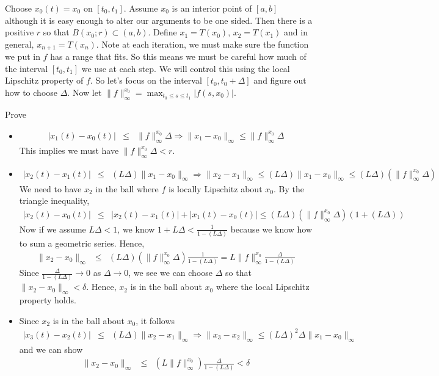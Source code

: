 \documentclass[11pt]{SelfArxOneColBMN}
\begin{document}
\noindent
Choose $x_0(t) = x_0$ on $[t_0,t_1]$.
Assume $x_0$ is an interior point of $[a,b]$
although it is easy enough to alter our arguments to be one
sided.  Then there is a positive $r$ so that $B(x_0;r) \subset (a,b)$.
Define $x_1 = T(x_0)$, $x_2 = T(x_1)$
and in general, $x_{n+1} = T(x_n)$.  Note at each
iteration, we must make sure the function we put in $f$
has a range that fits.   So this means we must be careful
how much of the interval $[t_0,t_1]$ we use at each step.
We will control this using the local Lipschitz property of $f$.
So let's focus on the interval $[t_0, t_0 + \Delta]$ and figure out
how to choose $\Delta$.  Now let $\|f\|^{x_0}_\infty = \max_{t_0 \leq s \leq t_1} |f(s,x_0)|$.

\begin{exercise}
Prove
\begin{itemize}
\item 
\begin{eqnarray*}
|x_1(t) - x_0(t)| &\leq& \|f\|^{x_0}_\infty \Delta
\Longrightarrow
\|x_1 - x_0\|_\infty \leq \|f\|^{x_0}_\infty \Delta
\end{eqnarray*}
\noindent
This implies we must have $\|f\|^{x_0}_\infty \Delta < r$.
\item
\begin{eqnarray*}
|x_2(t) - x_1(t)| &\leq& (L \Delta) \|x_1 - x_0\|_\infty
\Longrightarrow
\|x_2 - x_1\|_\infty \leq  ( L \Delta)  \|x_1 - x_0\|_\infty \leq  ( L \Delta) (\|f\|^{x_0}_\infty \Delta)
\end{eqnarray*}
\noindent
We need to have $x_2$ in the ball where $f$ is locally Lipschitz about $x_0$.
By the triangle inequality,
\begin{eqnarray*}
|x_2(t) - x_0(t)| &\leq& |x_2(t) - x_1(t)| + |x_1(t) - x_0(t)| 
                           \leq ( L \Delta) (\|f\|^{x_0}_\infty \Delta) (1 + (L \Delta) )
\end{eqnarray*}
\noindent
Now if we assume $L \Delta < 1$, we know $1 + L \Delta < \frac{1}{1 - (L \Delta)}$
because we know how to sum a geometric series.  Hence,
\begin{eqnarray*}
\|x_2 - x_0\|_\infty & \leq & ( L \Delta) (\|f\|^{x_0}_\infty \Delta) \frac{1}{1 - (L \Delta)}
 =L  \|f\|^{x_0}_\infty \frac{ \Delta}{1 - (L \Delta)}
\end{eqnarray*}
\noindent
Since $\frac{ \Delta}{1 - (L \Delta)} \rightarrow 0$ as $\Delta \rightarrow 0$,
we see we can choose $\Delta$ so that $\|x_2 - x_0\|_\infty < \delta$.
Hence, $x_2$ is in the ball about $x_0$ where the local Lipschitz property holds.
\item Since $x_2$ is in the ball about $x_0$, it follows
\begin{eqnarray*}
|x_3(t) - x_2(t)| &\leq& (L \Delta) \|x_2 - x_1\|_\infty
\Longrightarrow
\|x_3 - x_2\|_\infty \leq (L \Delta)^2  \Delta  \|x_1 - x_0\|_\infty
\end{eqnarray*}
\noindent
and we can show
\begin{eqnarray*}
\|x_2 - x_0\|_\infty & \leq & (L  \|f\|^{x_0}_\infty) \frac{ \Delta}{1 - (L \Delta)} < \delta
\end{eqnarray*}
\end{itemize}
\end{exercise}
\end{document}
